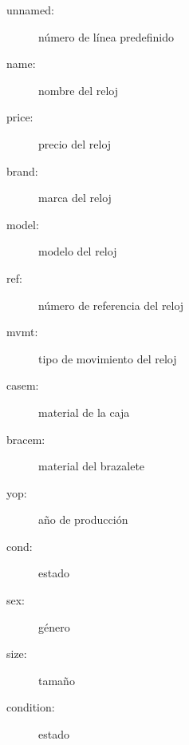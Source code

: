 \begin{description}
	\item[unnamed:] número de línea predefinido
	\item[name:] nombre del reloj
	\item[price:] precio del reloj
	\item[brand:] marca del reloj
	\item[model:] modelo del reloj
	\item[ref:] número de referencia del reloj
	\item[mvmt:] tipo de movimiento del reloj
	\item[casem:] material de la caja
	\item[bracem:] material del brazalete
	\item[yop:] año de producción
	\item[cond:] estado
	\item[sex:] género
	\item[size:] tamaño
	\item[condition:] estado
\end{description}